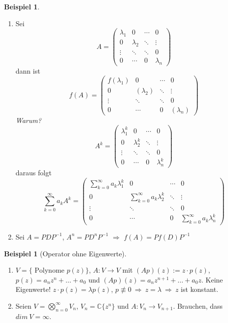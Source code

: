 \documentclass[11pt,titlepage]{article}
\theoremstyle{definition}
\newtheorem{example}[theorem]{Beispiel}
\theoremstyle{remark}
\begin{document}
\begin{example}
\begin{enumerate}
			\item Sei
			\[ A=\begin{pmatrix} \lambda_1 & 0 & \cdots & 0 \\
						       0 & \lambda_2 & \ddots & \vdots \\
						       \vdots & \ddots & \ddots & 0 \\
						       0 & \cdots & 0 & \lambda_n
				\end{pmatrix} \]
			dann ist
			\[ f(A)=\begin{pmatrix} f(\lambda_1) & 0 & \cdots & 0 \\
						       0 & (\lambda_2) & \ddots & \vdots \\
						       \vdots & \ddots & \ddots & 0 \\
						       0 & \cdots & 0 & (\lambda_n)
				\end{pmatrix} \]
			\textsl{Warum?}
			\[ A^k=\begin{pmatrix} \lambda_1^k & 0 & \cdots & 0 \\
						       0 & \lambda_2^k & \ddots & \vdots \\
						       \vdots & \ddots & \ddots & 0 \\
						       0 & \cdots & 0 & \lambda_n^k
				\end{pmatrix} \]
			daraus folgt
			\[ \sum_{k=0}^{\infty}a_k A^k=
				\begin{pmatrix} \sum_{k=0}^{\infty}a_k\lambda_1^k & 0 & \cdots & 0 \\
						       0 & \sum_{k=0}^{\infty}a_k\lambda_2^k & \ddots & \vdots \\
						       \vdots & \ddots & \ddots & 0 \\
						       0 & \cdots & 0 & \sum_{k=0}^{\infty}a_k\lambda_n^k
				\end{pmatrix} \]
			
			\item Sei $A=PDP^{-1}$, $A^n=PD^nP^{-1}$ $\Rightarrow$ $f(A)=Pf(D)P^{-1}$
		\end{enumerate}
	\end{example}
	
	\begin{example}[Operator ohne Eigenwerte]
		\begin{enumerate}
			\item$V=\{\text{ Polynome }p(z)\}$, $A:V\to V$ mit $(Ap)(z):=z\cdot p(z)$, $p(z)=a_nz^n+
			\ldots+a_0$ und 
			$(Ap)(z)=a_nz^{n+1}+\ldots+a_0 z$. Keine Eigenwerte! $z\cdot p(z)=\lambda p(z)$, 
			$p\not\equiv 0\ \Rightarrow\ z=\lambda\ \Rightarrow\ z$ ist konstant.
			
			\item Seien $V=\bigotimes_{n=0}^{\infty} V_n$, $V_n =\mathbb{C}\{z^n\}$ und 
			$A:V_n\to V_{n+1}$. Brauchen, dass $dim\ V=\infty$.
		\end{enumerate}
	\end{example}
	
\end{document}
